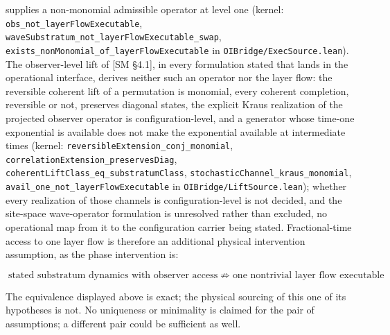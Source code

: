 \documentclass[
]{article}
\begin{document}
supplies a non-monomial admissible operator at level one (kernel:
\texttt{obs\_not\_layerFlowExecutable},
\texttt{waveSubstratum\_not\_layerFlowExecutable\_swap},
\texttt{exists\_nonMonomial\_of\_layerFlowExecutable} in
\texttt{OIBridge/ExecSource.lean}). The observer-level lift of {[}SM
§4.1{]}, in every formulation stated that lands in the operational
interface, derives neither such an operator nor the layer flow: the
reversible coherent lift of a permutation is monomial, every coherent
completion, reversible or not, preserves diagonal states, the explicit
Kraus realization of the projected observer operator is
configuration-level, and a generator whose time-one exponential is
available does not make the exponential available at intermediate times
(kernel: \texttt{reversibleExtension\_conj\_monomial},
\texttt{correlationExtension\_preservesDiag},
\texttt{coherentLiftClass\_eq\_substratumClass},
\texttt{stochasticChannel\_kraus\_monomial},
\texttt{avail\_one\_not\_layerFlowExecutable} in
\texttt{OIBridge/LiftSource.lean}); whether every realization of those
channels is configuration-level is not decided, and the site-space
wave-operator formulation is unresolved rather than excluded, no
operational map from it to the configuration carrier being stated.
Fractional-time access to one layer flow is therefore an additional
physical intervention assumption, as the phase intervention is:

\[\boxed{\text{stated substratum dynamics with observer access} \;\not\Rightarrow\; \text{one nontrivial layer flow executable}}\]

The equivalence displayed above is exact; the physical sourcing of this
one of its hypotheses is not. No uniqueness or minimality is claimed for
the pair of assumptions; a different pair could be sufficient as well.
\end{document}
